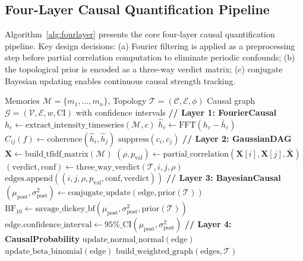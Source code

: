 \documentclass[11pt,a4paper]{article}
\begin{document}
\subsection{Four-Layer Causal Quantification Pipeline}

Algorithm~\ref{alg:fourlayer} presents the core four-layer causal quantification pipeline. Key design decisions: (a) Fourier filtering is applied as a preprocessing step before partial correlation computation to eliminate periodic confounds; (b) the topological prior is encoded as a three-way verdict matrix; (c) conjugate Bayesian updating enables continuous causal strength tracking.

\begin{algorithm}[H]
\caption{Four-Layer Causal Quantification Pipeline}
\label{alg:fourlayer}
\begin{algorithmic}[1]
\Require Memories \(\mathcal{M} = \{m_1, \ldots, m_n\}\), Topology \(\mathcal{T} = (\mathcal{C}, \mathcal{E}, \phi)\)
\Ensure Causal graph \(\mathcal{G} = (\mathcal{V}, \mathcal{E}, w, \text{CI})\) with confidence intervals
\State \textbf{// Layer 1: FourierCausal}
    \State \(h_c \gets \text{extract\_intensity\_timeseries}(\mathcal{M}, c)\)
    \State \(\hat{h}_c \gets \text{FFT}(h_c - \bar{h}_c)\)
        \State \(C_{ij}(f) \gets \text{coherence}(\hat{h}_i, \hat{h}_j)\)
         \State \(\text{suppress}(c_i, c_j)\) \EndIf
    \EndFor
\EndFor
\State \textbf{// Layer 2: GaussianDAG}
\State \(\mathbf{X} \gets \text{build\_tfidf\_matrix}(\mathcal{M})\)
    \State \((\rho, p_{\text{val}}) \gets \text{partial\_correlation}(\mathbf{X}[i], \mathbf{X}[j], \bar{\mathbf{X}})\)
        \State \((\text{verdict}, \text{conf}) \gets \text{three\_way\_verdict}(\mathcal{T}, i, j, \rho)\)
        \State \(\text{edges}.\text{append}((i, j, \rho, p_{\text{val}}, \text{conf}, \text{verdict}))\)
    \EndIf
\EndFor
\State \textbf{// Layer 3: BayesianCausal}
    \State \((\mu_{\text{post}}, \sigma^2_{\text{post}}) \gets \text{conjugate\_update}(\text{edge}, \text{prior}(\mathcal{T}))\)
    \State \(\text{BF}_{10} \gets \text{savage\_dickey\_bf}(\mu_{\text{post}}, \sigma^2_{\text{post}}, \text{prior}(\mathcal{T}))\)
    \State \(\text{edge}.\text{confidence\_interval} \gets 95\%\_\text{CI}(\mu_{\text{post}}, \sigma^2_{\text{post}})\)
\EndFor
\State \textbf{// Layer 4: CausalProbability}
     \State \(\text{update\_normal\_normal}(\text{edge})\) \Else\ \State \(\text{update\_beta\_binomial}(\text{edge})\) \EndIf
\EndFor
\State \Return \(\text{build\_weighted\_graph}(\text{edges}, \mathcal{T})\)
\end{algorithmic}
\end{algorithm}
\end{document}
